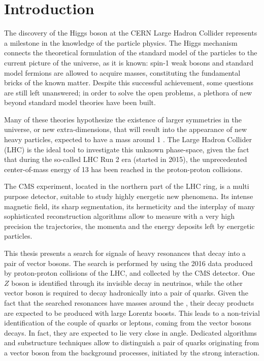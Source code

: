 \chapter{Introduction}

The discovery of the Higgs boson at the CERN Large Hadron Collider represents a milestone in the knowledge of the particle physics. The Higgs mechanism connects the theoretical formulation of the standard model of the particles to the current picture of the universe, as it is known: spin-1 weak bosons and standard model fermions are allowed to acquire masses, constituting the fundamental bricks of the known matter. Despite this successful achievement, some questions are still left unanswered; in order to solve the open problems, a plethora of new beyond standard model theories have been built.

\noindent Many of these theories hypothesize the existence of larger symmetries in the universe, or new extra-dimensions, that will result into the appearance of new heavy particles, expected to have a mass around 1 \TeV. The Large Hadron Collider (LHC) is the ideal tool to investigate this unknown phase-space, given the fact that during the so-called LHC Run 2 era (started in 2015), the unprecedented center-of-mass energy of 13 \TeV has been reached in the proton-proton collisions.

\noindent The CMS experiment, located in the northern part of the LHC ring, is a multi purpose detector, suitable to study highly energetic new phenomena. Its intense magnetic field, its sharp segmentation, its hermeticity and the interplay of many sophisticated reconstruction algorithms allow to measure with a very high precision the trajectories, the momenta and the energy deposits left by energetic particles.

\vspace*{1\baselineskip}

\noindent This thesis presents a search for signals of heavy resonances that decay into a pair of vector bosons. The search is performed by using the 2016 data produced by proton-proton collisions of the LHC, and collected by the CMS detector. One $Z$ boson is identified through its invisible decay in neutrinos, while the other vector boson is required to decay hadronically into a pair of quarks. Given the fact that the searched resonances have masses around the \TeV, their decay products are expected to be produced with large Lorentz boosts. This leads to a non-trivial identification of the couple of quarks or leptons, coming from the vector bosons decays. In fact, they are expected to lie very close in angle. Dedicated algorithms and substructure techniques allow to distinguish a pair of quarks originating from a vector boson from the background processes, initiated by the strong interaction.

